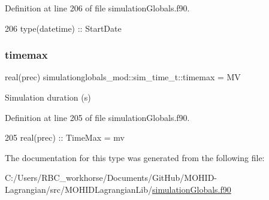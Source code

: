 Definition at line 206 of file simulation\+Globals.\+f90.


\begin{DoxyCode}
206         \textcolor{keywordtype}{type}(datetime)  :: StartDate
\end{DoxyCode}
\mbox{\label{structsimulationglobals__mod_1_1sim__time__t_ae84053cfbfb0b731cbf15e7334f223cd}} 
\subsubsection{\texorpdfstring{timemax}{timemax}}
{\footnotesize\ttfamily real(prec) simulationglobals\+\_\+mod\+::sim\+\_\+time\+\_\+t\+::timemax = MV\hspace{0.3cm}{\ttfamily [private]}}



Simulation duration (s) 



Definition at line 205 of file simulation\+Globals.\+f90.


\begin{DoxyCode}
205         \textcolor{keywordtype}{real(prec)}      :: TimeMax = mv              
\end{DoxyCode}


The documentation for this type was generated from the following file\+:\begin{DoxyCompactItemize}
\item 
C\+:/\+Users/\+R\+B\+C\+\_\+workhorse/\+Documents/\+Git\+Hub/\+M\+O\+H\+I\+D-\/\+Lagrangian/src/\+M\+O\+H\+I\+D\+Lagrangian\+Lib/\mbox{\hyperlink{simulation_globals_8f90}{simulation\+Globals.\+f90}}\end{DoxyCompactItemize}
